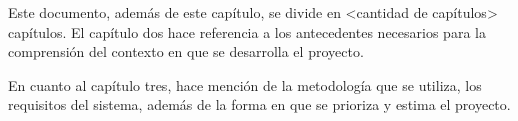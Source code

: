 Este documento, además de este capítulo, se divide en <cantidad de capítulos> capítulos. El capítulo dos hace referencia a los antecedentes necesarios para la comprensión del contexto en que se desarrolla el proyecto.

En cuanto al capítulo tres, hace mención de la metodología que se utiliza, los requisitos del sistema, además de la forma en que se prioriza y estima el proyecto.

